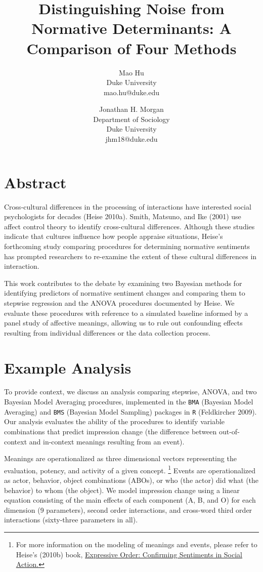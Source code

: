 \documentclass[]{article}
\title{Distinguishing Noise from Normative Determinants: A Comparison of Four Methods}
\author{Mao Hu \\ Duke University \\ mao.hu@duke.edu \and Jonathan H. Morgan \\ Department of Sociology \\ Duke University \\ jhm18@duke.edu}
\begin{document}
\maketitle

\section{Abstract}

Cross-cultural differences in the processing of interactions have interested social psychologists for decades (Heise 2010a). Smith, Matsuno, and Ike (2001) use affect control theory to identify cross-cultural differences. Although these studies indicate that cultures influence how people appraise situations, Heise's forthcoming study comparing procedures for determining normative sentiments has prompted researchers to re-examine the extent of these cultural differences in interaction.

This work contributes to the debate by examining two Bayesian methods for identifying predictors of normative sentiment changes and comparing them to stepwise regression and the ANOVA procedures documented by Heise.  We evaluate these procedures with reference to a simulated baseline informed by a panel study of affective meanings, allowing us to rule out confounding effects resulting from individual differences or the data collection process.  

\section{Example Analysis}

To provide context, we discuss an analysis comparing stepwise, ANOVA, and two Bayesian Model Averaging procedures, implemented in the \verb+BMA+ (Bayesian Model Averaging) and \verb+BMS+ (Bayesian Model Sampling) packages in \verb+R+ (Feldkircher 2009).  Our analysis evaluates the ability of the procedures to identify variable combinations that predict impression change (the difference between out-of-context and in-context meanings resulting from an event).

 Meanings are operationalized as three dimensional vectors representing the evaluation, potency, and activity of a given concept. \footnote{For more information on the modeling of meanings and events, please refer to Heise’s (2010b) book, \underline{Expressive Order: Confirming Sentiments in Social Action.}} Events are operationalized as actor, behavior, object combinations (ABOs), or who (the actor) did what (the behavior) to whom (the object).  We model impression change using a linear equation consisting of the main effects of each component (A, B, and O) for each dimension (9 parameters), second order interactions, and cross-word third order interactions (sixty-three parameters in all).
 
\end{document}
